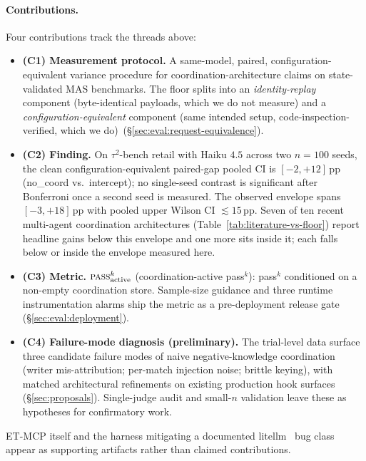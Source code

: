 \paragraph{Contributions.}
Four contributions track the threads above:
\begin{itemize}
    \item \textbf{(C1) Measurement protocol.} A same-model,
        paired, configuration-equivalent variance procedure for
        coordination-architecture claims on state-validated MAS
        benchmarks. The floor splits into an
        \emph{identity-replay} component (byte-identical
        payloads, which we do not measure) and a
        \emph{configuration-equivalent} component (same intended
        setup, code-inspection-verified, which we
        do)~(\S\ref{sec:eval:request-equivalence}).

    \item \textbf{(C2) Finding.} On $\tau^2$-bench retail with
        Haiku $4.5$ across two $n{=}100$ seeds, the clean
        configuration-equivalent paired-gap pooled CI is
        $[{-}2,{+}12]$\,pp (no\_coord vs.\ intercept);
        no single-seed contrast is significant after Bonferroni
        once a second seed is measured. The observed envelope
        spans $[{-}3,{+}18]$\,pp with pooled upper Wilson CI
        $\lesssim 15$\,pp. Seven of ten recent multi-agent
        coordination architectures
        (Table~\ref{tab:literature-vs-floor})
        report headline gains below this envelope and one more
        sits inside it; each falls below or inside the envelope
        measured here.

    \item \textbf{(C3) Metric.}
        $\textsc{pass}^k_{\textrm{active}}$ (coordination-active
        pass$^k$): pass$^k$ conditioned on a non-empty
        coordination store. Sample-size guidance and three
        runtime instrumentation alarms ship the metric as a
        pre-deployment release gate
        (\S\ref{sec:eval:deployment}).

    \item \textbf{(C4) Failure-mode diagnosis (preliminary).}
        The trial-level data surface three candidate
        failure modes of naive negative-knowledge coordination
        (writer mis-attribution; per-match injection noise;
        brittle keying), with matched architectural refinements
        on existing production hook surfaces
        (\S\ref{sec:proposals}). Single-judge audit and small-$n$
        validation leave these as hypotheses for confirmatory work.
\end{itemize}

ET-MCP itself and the harness mitigating a documented
litellm~\cite{litellmissue12404,litellmissue15322} bug class
appear as supporting artifacts rather than claimed contributions.
